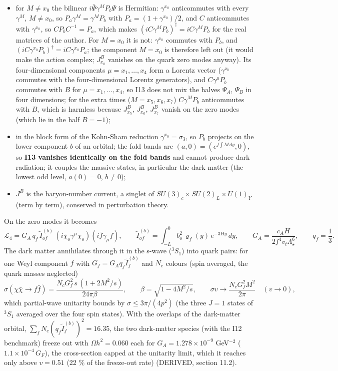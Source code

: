 \documentclass[
  10pt,
]{article}
\providecommand{\tightlist}{%
  \setlength{\itemsep}{0pt}\setlength{\parskip}{0pt}}
\begin{document}
\begin{itemize}
\tightlist
\item
  for \(M \ne x_0\) the bilinear \(i\bar\Psi\gamma^MP_b\Psi\) is
  Hermitian: \(\gamma^{x_0}\) anticommutes with every \(\gamma^M\),
  \(M \ne x_0\), so \(P_a\gamma^M = \gamma^MP_b\) with
  \(P_a = (1 + \gamma^{x_0})/2\), and \(C\) anticommutes with
  \(\gamma^{x_0}\), so \(CP_bC^{-1} = P_a\), which makes
  \((iC\gamma^MP_b)^\dagger = iC\gamma^MP_b\) for the real matrices of
  the author. For \(M = x_0\) it is not: \(\gamma^{x_0}\) commutes with
  \(P_b\), and \((iC\gamma^{x_0}P_b)^\dagger = iC\gamma^{x_0}P_a\); the
  component \(M = x_0\) is therefore left out (it would make the action
  complex; \(J^B_{x_0}\) vanishes on the quark zero modes anyway). Its
  four-dimensional components \(\mu = x_1, \dots, x_4\) form a Lorentz
  vector (\(\gamma^{x_0}\) commutes with the four-dimensional Lorentz
  generators), and \(C\gamma^\mu P_b\) commutes with \(B\) for
  \(\mu = x_1, \dots, x_4\), so I13 does not mix the halves \(\Psi_A\),
  \(\Psi_B\) in four dimensions; for the extra times
  (\(M = x_5, x_6, x_7\)) \(C\gamma^MP_b\) anticommutes with \(B\),
  which is harmless because \(J^B_{x_5}\), \(J^B_{x_6}\), \(J^B_{x_7}\)
  vanish on the zero modes (which lie in the half \(B = -1\));
\item
  in the block form of the Kohn-Sham reduction
  \(\gamma^{x_0} = \sigma_3\), so \(P_b\) projects on the lower
  component \(b\) of an orbital; the fold bands are
  \((a, 0) = (e^{f\int M\,dy}, 0)\), so \textbf{I13 vanishes identically
  on the fold bands} and cannot produce dark radiation; it couples the
  massive states, in particular the dark matter (the lowest odd level,
  \(a(0) = 0\), \(b \ne 0\));
\item
  \(J^B\) is the baryon-number current, a singlet of
  \(SU(3)_c\times SU(2)_L\times U(1)_Y\) (term by term), conserved in
  perturbation theory.
\end{itemize}

On the zero modes it becomes
\[ \mathcal L_4 = G_A\,q_f\,\tilde I^{(b)}_{of}\,(i\bar\chi_o\gamma^\mu\chi_o)(i\bar f\gamma_\mu f),\qquad \tilde I^{(b)}_{of} = \int_{-L}^{0}b_o^2\,\varrho_f(y)\,e^{-3Hy}\,dy,\qquad
   G_A = \frac{c_AH}{2f^4v_t\Lambda_\star^6},\qquad q_f = \frac13 .\]
The dark matter annihilates through it in the s-wave (\(^3S_1\)) into
quark pairs: for one Weyl component \(f\) with
\(G_f = G_Aq_f\tilde I^{(b)}_f\) and \(N_c\) colours (spin averaged, the
quark masses neglected)
\[ \sigma(\chi\bar\chi \to f\bar f) = \frac{N_cG_f^2\,s\,(1 + 2M^2/s)}{24\pi\beta},\qquad \beta = \sqrt{1 - 4M^2/s},\qquad \sigma v \to \frac{N_cG_f^2M^2}{2\pi}\quad (v \to 0), \]
which partial-wave unitarity bounds by \(\sigma \le 3\pi/(4p^2)\) (the
three \(J = 1\) states of \(^3S_1\) averaged over the four spin states).
With the overlaps of the dark-matter orbital,
\(\sum_fN_c(q_f\tilde I^{(b)}_f)^2 = 16.35\), the two dark-matter
species (with the I12 benchmark) freeze out with \(\Omega h^2 = 0.060\)
each for \(G_A = 1.278\times10^{-9}\) GeV\(^{-2}\)
(\(1.1\times10^{-4}\,G_F\)), the cross-section capped at the unitarity
limit, which it reaches only above \(v = 0.51\) (22 \% of the freeze-out
rate) (DERIVED, section 11.2).
\end{document}

